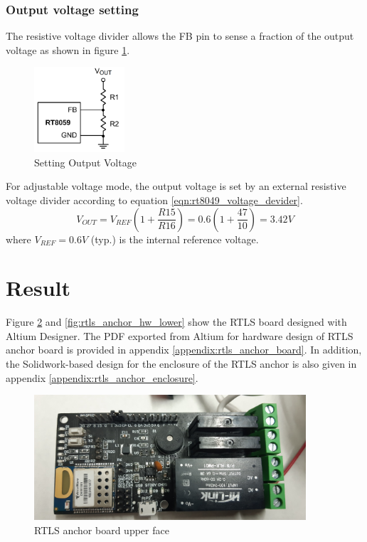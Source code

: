 \documentclass[\main/thesis.tex]{subfiles}
\begin{document}
\subsubsection{Output voltage setting}
The resistive voltage divider allows the FB pin to sense a fraction of the output voltage as shown in figure \ref{fig:rt8049_setting_output_voltage}.
\begin{figure}[H]
    \begin{center}
        \includegraphics[width=0.3\textwidth]{rt8049_setting_output_voltage.png}
    \end{center}
    \caption{Setting Output Voltage}
    \label{fig:rt8049_setting_output_voltage}
\end{figure}

For adjustable voltage mode, the output voltage is set by an external resistive voltage divider according to equation \ref{eqn:rt8049_voltage_devider}.
\begin{equation}
    V_{OUT} = V_{REF} (1 + \frac{R15}{R16}) = 0.6 (1 + \frac{47}{10}) = 3.42V
    \label{eqn:rt8049_voltage_devider}
\end{equation}
where $V_{REF} = 0.6V$ (typ.) is the internal reference voltage.

\section{Result}
Figure \ref{fig:rtls_anchor_hw_upper} and \ref{fig:rtls_anchor_hw_lower} show the RTLS board designed with Altium Designer. The PDF exported from Altium for hardware design of RTLS anchor board is provided in appendix \ref{appendix:rtls_anchor_board}. In addition, the Solidwork-based design for the enclosure of the RTLS anchor is also given in appendix \ref{appendix:rtls_anchor_enclosure}.
\begin{figure}[H]
    \begin{center}
        \includegraphics[width=0.9\textwidth]{rtls_anchor_hw_upper.jpg}
    \end{center}
    \caption{RTLS anchor board upper face}
    \label{fig:rtls_anchor_hw_upper}
\end{figure}
\end{document}
